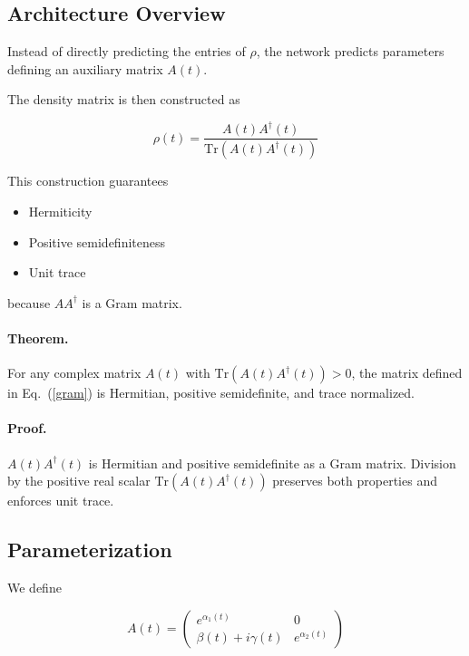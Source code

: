 \documentclass[11pt]{article}
\begin{document}
\subsection{Architecture Overview}

Instead of directly predicting the entries of $\rho$, the network predicts parameters defining an auxiliary matrix $A(t)$.

The density matrix is then constructed as

\begin{equation}
\rho(t)
=
\frac{A(t)A^\dagger(t)}
{\mathrm{Tr}(A(t)A^\dagger(t))}
\label{gram}
\end{equation}

This construction guarantees

\begin{itemize}
\item Hermiticity
\item Positive semidefiniteness
\item Unit trace
\end{itemize}

because $AA^\dagger$ is a Gram matrix.

\paragraph{Theorem.}
For any complex matrix $A(t)$ with $\mathrm{Tr}(A(t)A^\dagger(t))>0$, the matrix defined in Eq.~(\ref{gram}) is Hermitian, positive semidefinite, and trace normalized.

\paragraph{Proof.}
$A(t)A^\dagger(t)$ is Hermitian and positive semidefinite as a Gram matrix. Division by the positive real scalar $\mathrm{Tr}(A(t)A^\dagger(t))$ preserves both properties and enforces unit trace.

\subsection{Parameterization}

We define

\begin{equation}
A(t)
=
\begin{pmatrix}
e^{\alpha_1(t)} & 0 \\
\beta(t)+i\gamma(t) & e^{\alpha_2(t)}
\end{pmatrix}
\label{paramA}
\end{equation}
\end{document}
